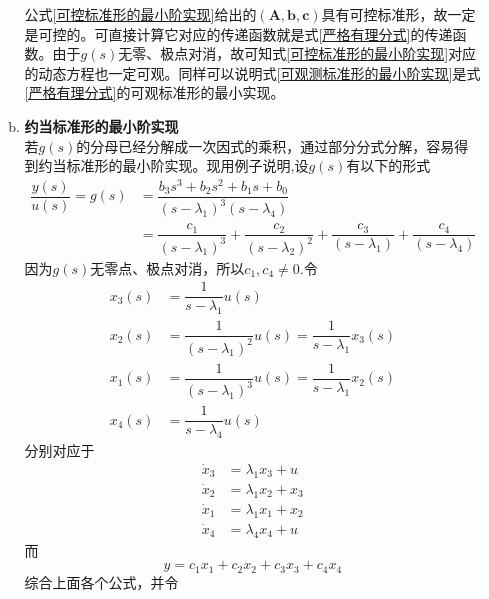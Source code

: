 \begin{enumerate}[\hspace*{2em} (1)]
\begin{enumerate}[(a) ]
	\hspace*{2em} 公式\eqref{可控标准形的最小阶实现}给出的$(\bm{A,b,c})$具有可控标准形，故一定是可控的。可直接计算它对应的传递函数就是式\eqref{严格有理分式}的传递函数。由于$g(s)$无零、极点对消，故可知式\eqref{可控标准形的最小阶实现}对应的动态方程也一定可观。同样可以说明式\eqref{可观测标准形的最小阶实现}是式\eqref{严格有理分式}的可观标准形的最小实现。
	
	\item \textbf{约当标准形的最小阶实现}\\
	\hspace*{2em}若$g(s)$的分母已经分解成一次因式的乘积，通过部分分式分解，容易得到约当标准形的最小阶实现。现用例子说明,设$g(s)$有以下的形式
	\begin{equation}
		\begin{aligned}
			\dfrac{y(s)}{u(s)} = g(s) &= \dfrac{b_3s^3 + b_2 s^2 + b_1 s + b_0}{(s-\lambda_1)^3 (s- \lambda_4)}\\[0.5em]
			& = \dfrac{c_1}{(s-\lambda_1)^3} + \dfrac{c_2}{(s-\lambda_2)^2} + \dfrac{c_3}{(s - \lambda_1)} + \dfrac{c_4}{(s - \lambda_4)}
		\end{aligned}
	\end{equation}
	因为$g(s)$无零点、极点对消，所以$c_1,c_4 \neq 0.$令
	\begin{equation}
		\begin{aligned}
			x_3(s) &= \dfrac{1}{s - \lambda_1}u(s)\\[0.5em]
			x_2(s) &= \dfrac{1}{(s - \lambda_1)^2}u(s) = \dfrac{1}{s - \lambda_1}x_3(s)\\[0.5em]
			x_1(s) &= \dfrac{1}{(s- \lambda_1)^3}u(s) = \dfrac{1}{s - \lambda_1}x_2(s)\\[0.5em]
			x_4(s) &= \dfrac{1}{s - \lambda_4}u(s)
		\end{aligned}
	\end{equation}
	分别对应于
	\begin{equation}
		\begin{aligned}
			\dot{x}_3 &= \lambda_1 x_3 + u\\
			\dot{x}_2 &= \lambda_1 x_2 + x_3\\
			\dot{x}_1 &= \lambda_1 x_1 + x_2\\
			\dot{x}_4 &= \lambda_4 x_4 + u
		\end{aligned}
	\end{equation}
	而
	\begin{equation}
		y = c_1x_1 + c_2x_2 + c_3x_3 + c_4x_4
	\end{equation}
	综合上面各个公式，并令
	\begin{equation}

\end{equation}
\end{enumerate}
\end{enumerate}
